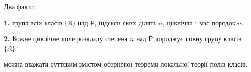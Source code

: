 \documentclass[11pt]{article}
\begin{document}
Два факти:

\noindent\textbf{1.} група всіх класів \(\{\mathfrak K\}\) над \(\mathsf{P}\), індекси яких ділять \(n\), циклічна і має порядок \(n\).

\noindent\textbf{2.} Кожне циклічне поле розкладу степеня \(n\) над \(\mathsf{P}\) породжує повну групу класів \(\{\mathfrak K\}\).

можна вважати суттєвим змістом оберненої теореми локальної теорії полів класів.


\clearpage
\end{document}
